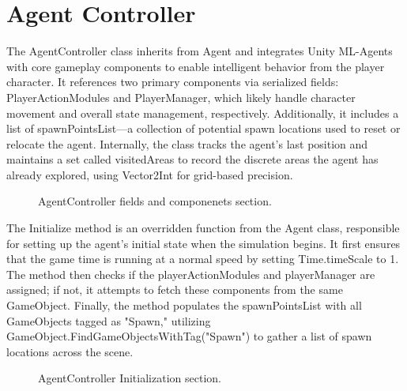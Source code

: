 \documentclass[12pt,oneside,openright,a4paper]{cpe-english-project}
\begin{document}
\section{Agent Controller}
The AgentController class inherits from Agent and integrates Unity ML-Agents with core gameplay components to enable intelligent behavior from the player character. It references two primary components via serialized fields: PlayerActionModules and PlayerManager, which likely handle character movement and overall state management, respectively. Additionally, it includes a list of spawnPointsList—a collection of potential spawn locations used to reset or relocate the agent. Internally, the class tracks the agent's last position and maintains a set called visitedAreas to record the discrete areas the agent has already explored, using Vector2Int for grid-based precision.\par
 \begin{figure}[!h]
 \centering
\caption{AgentController fields and componenets section.}\label{fig:agentfac}
\end{figure}
\newpage
The Initialize method is an overridden function from the Agent class, responsible for setting up the agent’s initial state when the simulation begins. It first ensures that the game time is running at a normal speed by setting Time.timeScale to 1. The method then checks if the playerActionModules and playerManager are assigned; if not, it attempts to fetch these components from the same GameObject. Finally, the method populates the spawnPointsList with all GameObjects tagged as "Spawn," utilizing GameObject.FindGameObjectsWithTag("Spawn") to gather a list of spawn locations across the scene.\par
 \begin{figure}[!h]
 \centering
\caption{AgentController Initialization section.}\label{fig:agentini}
\end{figure}
\end{document}
